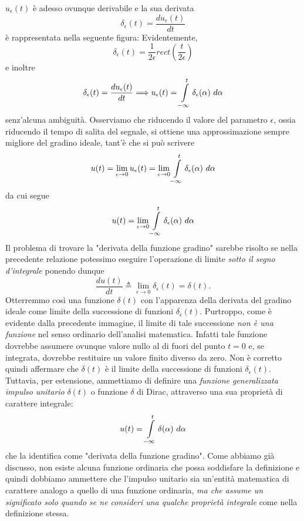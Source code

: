 \documentclass[12pt,oneside,openany]{memoir}
\numberwithin{equation}{subsection}
\begin{document}
$u_{\epsilon}(t)$ \`e adesso ovunque derivabile e la sua derivata
\[
    \delta_{\epsilon}(t) = \frac{d u_{\epsilon}(t)}{dt}
\]
\`e rappresentata nella seguente figura:
Evidentemente,
\[
    \delta_{\epsilon}(t) = \frac{1}{2 \epsilon} rect\left(\frac{t}{2 \epsilon}
    \right)
\]
e inoltre
\[
    \delta_{\epsilon}(t) = \frac{d u_{\epsilon}(t)}{dt} \Longrightarrow
    u_{\epsilon}(t) = \int\displaylimits_{-\infty}^{t} \delta_{\epsilon}(\alpha)
    \ d\alpha
\]
senz'alcuna ambiguit\`a.
\bigbreak
Osserviamo che riducendo il valore del parametro $\epsilon$, ossia riducendo il
tempo di salita del segnale, si ottiene una approssimazione sempre migliore del
gradino ideale, tant'\`e che si pu\`o scrivere
\[
    u(t) = \lim_{\epsilon \rightarrow 0} u_{\epsilon}(t) =
    \lim_{\epsilon \rightarrow 0}
    \int\displaylimits_{-\infty}^{t} \delta_{\epsilon}(\alpha) \ d\alpha
\]
da cui segue
\[
    u(t) = \lim_{\epsilon \rightarrow 0}
    \int\displaylimits_{-\infty}^{t} \delta_{\epsilon}(\alpha) \ d\alpha
\]
Il problema di trovare la "derivata della funzione gradino" sarebbe risolto se
nella precedente relazione potessimo eseguire l'operazione di limite
\textit{sotto il segno d'integrale} ponendo dunque
\[
    \frac{d u(t)}{dt} \triangleq \lim_{\epsilon \rightarrow 0}
    \delta_{\epsilon}(t) = \delta(t).
\]
Otterremmo cos\`i una funzione $\delta(t)$ con l'apparenza della derivata del
gradino ideale come limite della successione di funzioni $\delta_{\epsilon}(t)$.
Purtroppo, come \`e evidente dalla precedente immagine, il limite di tale
successione \textit{non \`e una funzione} nel senso ordinario dell'analisi
matematica. Infatti tale funzione dovrebbe assumere ovunque valore nullo al di
fuori del punto $t = 0$ e, se integrata, dovrebbe restituire un valore finito
diverso da zero. Non \`e corretto quindi affermare che $\delta(t)$ \`e il limite
della successione di funzioni $\delta_{\epsilon}(t)$. Tuttavia, per estensione,
ammettiamo di definire una \textit{funzione generalizzata impulso unitario}
$\delta(t)$ o funzione $\delta$ di Dirac, attraverso una sua propriet\`a di
carattere integrale:
\[
    u(t) = \int\displaylimits_{-\infty}^{t} \delta(\alpha) \ d\alpha
\]
che la identifica come "derivata della funzione gradino".
\bigbreak
Come abbiamo gi\`a discusso, non esiste alcuna funzione ordinaria che possa
soddisfare la definizione e quindi dobbiamo ammettere che l'impulso unitario sia
un'entit\`a matematica di carattere analogo a quello di una funzione ordinaria,
\textit{ma che assume un significato solo quando se ne consideri una qualche
propriet\`a integrale} come nella definizione stessa.
\end{document}
